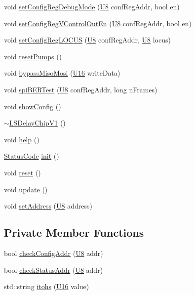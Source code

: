 \begin{DoxyCompactItemize}
void \hyperlink{classLSDelayChipV1_a813eca3585445d504d60a93ec55817f4}{set\+Config\+Reg\+Debug\+Mode} (\hyperlink{ICECALv3_8h_a3cb25ca6f51f003950f9625ff05536fc}{U8} conf\+Reg\+Addr, bool en)
\item 
void \hyperlink{classLSDelayChipV1_afd8a57dda2cd6a62607cbfc9808c3220}{set\+Config\+Reg\+V\+Control\+Out\+En} (\hyperlink{ICECALv3_8h_a3cb25ca6f51f003950f9625ff05536fc}{U8} conf\+Reg\+Addr, bool en)
\item 
void \hyperlink{classLSDelayChipV1_a2a1eebeacb7ed2b0fc5584f3630d0aa0}{set\+Config\+Reg\+L\+O\+C\+US} (\hyperlink{ICECALv3_8h_a3cb25ca6f51f003950f9625ff05536fc}{U8} conf\+Reg\+Addr, \hyperlink{ICECALv3_8h_a3cb25ca6f51f003950f9625ff05536fc}{U8} locus)
\item 
void \hyperlink{classLSDelayChipV1_a5b2c2e527b044b128306695828e9fd19}{reset\+Pumps} ()
\item 
void \hyperlink{classLSDelayChipV1_a9e04b654e8d6d63efe23fc3b31e15ce6}{bypass\+Miso\+Mosi} (\hyperlink{ICECALv3_8h_adf928e51a60dba0df29d615401cc55a8}{U16} write\+Data)
\item 
void \hyperlink{classLSDelayChipV1_ad0ed8d0797c985d7595fbe56f0da1996}{spi\+B\+E\+R\+Test} (\hyperlink{ICECALv3_8h_a3cb25ca6f51f003950f9625ff05536fc}{U8} conf\+Reg\+Addr, long n\+Frames)
\item 
void \hyperlink{classLSDelayChipV1_a01c1e85ae0d0e031164fe2d47b4f4824}{show\+Config} ()
\item 
\hyperlink{classLSDelayChipV1_a86c96f60b9be6f35745536df46919817}{$\sim$\+L\+S\+Delay\+Chip\+V1} ()
\item 
void \hyperlink{classLSDelayChipV1_a3d57457a70f7d42687197704321b0c8e}{help} ()
\item 
\hyperlink{classStatusCode}{Status\+Code} \hyperlink{classLSDelayChipV1_af8bc9c84a1b65cbc2176fdbc349e829c}{init} ()
\item 
void \hyperlink{classLSDelayChipV1_a6b772084a850e96b2f9bb5600c29259c}{reset} ()
\item 
void \hyperlink{classLSDelayChipV1_a7d4eb6fb7ca527286d36f30123bfd60a}{update} ()
\item 
void \hyperlink{classLSDelayChipV1_a04ec44c79258fd22f7d2d5ea27a67648}{set\+Address} (\hyperlink{ICECALv3_8h_a3cb25ca6f51f003950f9625ff05536fc}{U8} address)
\end{DoxyCompactItemize}
\subsection*{Private Member Functions}
\begin{DoxyCompactItemize}
\item 
bool \hyperlink{classLSDelayChipV1_aa8118972150a9e1e95e9006e003c0206}{check\+Config\+Addr} (\hyperlink{ICECALv3_8h_a3cb25ca6f51f003950f9625ff05536fc}{U8} addr)
\item 
bool \hyperlink{classLSDelayChipV1_a5083f29a93d38258d9de00dd5a89af99}{check\+Status\+Addr} (\hyperlink{ICECALv3_8h_a3cb25ca6f51f003950f9625ff05536fc}{U8} addr)
\item 
std\+::string \hyperlink{classLSDelayChipV1_af7f4d72fb404b6b3d7b41fd01876ed0a}{itohs} (\hyperlink{ICECALv3_8h_adf928e51a60dba0df29d615401cc55a8}{U16} value)
\end{DoxyCompactItemize}
